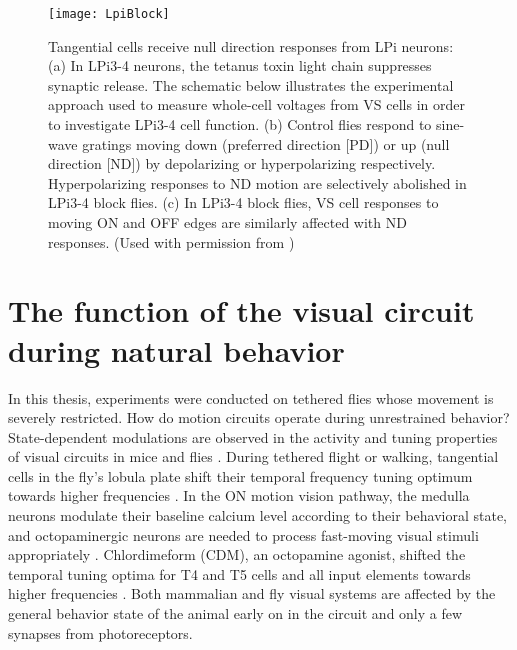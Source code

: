 

\begin{figure}
\centering
\hspace*{-1cm} 
\texttt{[image: LpiBlock]}
\caption[Tangential cells receive null direction responses from LPi neurons] {Tangential cells receive null direction responses from LPi neurons: (a) In LPi3-4 neurons, the tetanus toxin light chain suppresses synaptic release. The schematic below illustrates the experimental approach used to measure whole-cell voltages from VS cells in order to investigate LPi3-4 cell function. (b) Control flies respond to sine-wave gratings moving down (preferred direction [PD]) or up (null direction [ND]) by depolarizing or hyperpolarizing respectively. Hyperpolarizing responses to ND motion are selectively abolished in LPi3-4 block flies. (c) In LPi3-4 block flies, VS cell responses to moving ON and OFF edges are similarly affected with ND responses. (Used with permission from \parencite{Mauss2015})} 
\label{fig:lpiblock}
\end{figure}

\section{The function of the visual circuit during natural behavior}
In this thesis, experiments were conducted on tethered flies whose movement is severely restricted. How do motion circuits operate during unrestrained behavior? State-dependent modulations are observed in the activity and tuning properties of visual circuits in mice and flies \parencite{Maimon2011}. During tethered flight or walking, tangential cells in the fly's lobula plate shift their temporal frequency tuning optimum towards higher frequencies \parencite{Chiappe2010, Maimon2010, Jung2011}. In the ON motion vision pathway, the medulla neurons modulate their baseline calcium level according to their behavioral state, and octopaminergic neurons are needed to process fast-moving visual stimuli appropriately \parencite{Strother2018}. Chlordimeform (CDM), an octopamine agonist, shifted the temporal tuning optima for T4 and T5 cells and all input elements towards higher frequencies \parencite{Arenz2017}. Both mammalian and fly visual systems are affected by the general behavior state of the animal early on in the circuit and only a few synapses from photoreceptors.


